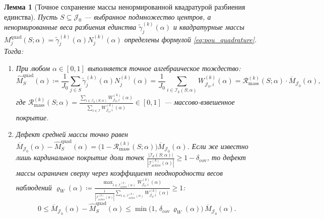\documentclass[11pt,a4paper]{article}
\newcommand{\II}{\mathcal{I}}
\newcommand{\JJJ}{\mathcal{J}}
\newtheorem{lemma}[theorem]{Лемма}
\theoremstyle{definition}
\theoremstyle{remark}
\begin{document}
\begin{lemma}[Точное сохранение массы ненормированной квадратурой разбиения единства]\label{lem:pou_unbiased}
Пусть $S \subseteq \JJJ_0$ --- выбранное подмножество центров, а ненормированные веса разбиения единства $\tilde{\gamma}_j^{(k)}(\alpha)$ и квадратурные массы $M_j^{\mathrm{quad}}(S; \alpha) = \tilde{\gamma}_j^{(k)}(\alpha) N_j^{(k)}(\alpha)$ определены формулой \eqref{eq:pou_quadrature}. Тогда:
\begin{enumerate}
    \item При любом $\alpha \in [0, 1]$ выполняется точное алгебраическое тождество:
    \begin{equation}\label{eq:exact_mass_preservation}
        \widehat{M}_S^{\mathrm{quad}}(\alpha) \coloneqq \frac{1}{J_0}\sum_{j \in S} \tilde{\gamma}_j^{(k)}(\alpha) N_j^{(k)}(\alpha) = \frac{1}{J_0}\sum_{i \in \II_k(S;\alpha)} W_{\JJJ_0, i}^{(k)}(\alpha) = \mathcal{R}_{\mathrm{mass}}^{(k)}(S; \alpha) \cdot \overline{M}_{\JJJ_0}(\alpha),
    \end{equation}
    где $\mathcal{R}_{\mathrm{mass}}^{(k)}(S; \alpha) = \frac{\sum_{i \in \II_k(S;\alpha)} W_{\JJJ_0, i}^{(k)}(\alpha)}{\sum_{i \in \II} W_{\JJJ_0, i}^{(k)}(\alpha)} \in [0, 1]$ --- массово-взвешенное покрытие.
    \item Дефект средней массы точно равен $\overline{M}_{\JJJ_0}(\alpha) - \widehat{M}_S^{\mathrm{quad}}(\alpha) = \bigl(1 - \mathcal{R}_{\mathrm{mass}}^{(k)}(S; \alpha)\bigr) \overline{M}_{\JJJ_0}(\alpha)$. Если же известно лишь кардинальное покрытие доли точек $\frac{|\II_k(S;\alpha)|}{|\II_{\mathrm{active}}^{(k)}(\alpha)|} \ge 1 - \delta_{\mathrm{cov}}$, то дефект массы ограничен сверху через коэффициент неоднородности весов наблюдений $\varrho_W(\alpha) \coloneqq \frac{\max_{i \in \II_{\mathrm{active}}^{(k)}(\alpha)} W_{\JJJ_0, i}^{(k)}(\alpha)}{\frac{1}{|\II_{\mathrm{active}}^{(k)}(\alpha)|}\sum_{i \in \II_{\mathrm{active}}^{(k)}(\alpha)} W_{\JJJ_0, i}^{(k)}(\alpha)} \ge 1$:
    \begin{equation}\label{eq:card_mass_defect}
        0 \le \overline{M}_{\JJJ_0}(\alpha) - \widehat{M}_S^{\mathrm{quad}}(\alpha) \le \min\bigl(1, \, \delta_{\mathrm{cov}} \, \varrho_W(\alpha)\bigr) \, \overline{M}_{\JJJ_0}(\alpha).
    \end{equation}
\end{enumerate}
\end{lemma}
\end{document}
